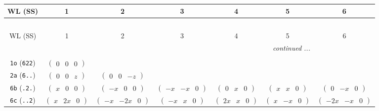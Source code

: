 \documentclass[fleqn,9pt,landscape]{jsarticle}
\begin{document}
\begin{center}
\renewcommand{\arraystretch}{1.2}
\begin{longtable}{ccccccc}
 \hline \hline
WL (SS) & 1 & 2 & 3 & 4 & 5 & 6 \\ \hline \endfirsthead

\multicolumn{6}{l}{\tablename\ \thetable{}} \\
 \hline \hline
WL (SS) & 1 & 2 & 3 & 4 & 5 & 6 \\ \hline \endhead

 \hline \hline
\multicolumn{6}{r}{\footnotesize\it continued ...} \\ \endfoot

 \hline \hline
\multicolumn{6}{r}{} \\ \endlastfoot

{\tt 1o} ({\tt 622}) & $ \begin{pmatrix} 0 & 0 & 0 \end{pmatrix} $ & $  $ & $  $ & $  $ & $  $ & $  $ \\ \hline
{\tt 2a} ({\tt 6..}) & $ \begin{pmatrix} 0 & 0 & z \end{pmatrix} $ & $ \begin{pmatrix} 0 & 0 & - z \end{pmatrix} $ & $  $ & $  $ & $  $ & $  $ \\ \hline
{\tt 6b} ({\tt .2.}) & $ \begin{pmatrix} x & 0 & 0 \end{pmatrix} $ & $ \begin{pmatrix} - x & 0 & 0 \end{pmatrix} $ & $ \begin{pmatrix} - x & - x & 0 \end{pmatrix} $ & $ \begin{pmatrix} 0 & x & 0 \end{pmatrix} $ & $ \begin{pmatrix} x & x & 0 \end{pmatrix} $ & $ \begin{pmatrix} 0 & - x & 0 \end{pmatrix} $ \\ \hline
{\tt 6c} ({\tt ..2}) & $ \begin{pmatrix} x & 2 x & 0 \end{pmatrix} $ & $ \begin{pmatrix} - x & - 2 x & 0 \end{pmatrix} $ & $ \begin{pmatrix} - x & x & 0 \end{pmatrix} $ & $ \begin{pmatrix} 2 x & x & 0 \end{pmatrix} $ & $ \begin{pmatrix} x & - x & 0 \end{pmatrix} $ & $ \begin{pmatrix} - 2 x & - x & 0 \end{pmatrix} $ \\ \hline

\end{longtable}
\end{center}
\end{document}
